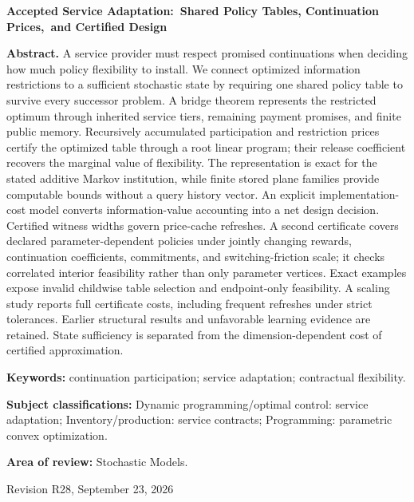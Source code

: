 \documentclass[11pt,letterpaper]{article}
\theoremstyle{definition}\newtheorem{assumption}[theorem]{Assumption}
\begin{document}
\begin{titlepage}\centering
{\Large\bfseries Accepted Service Adaptation:\ Shared Policy Tables, Continuation Prices,\ and Certified Design\par}
\vspace{.35in}{Anonymous manuscript for Operations Research\par}\vspace{.25in}
\begin{minipage}{\textwidth}
\textbf{Abstract.}
A service provider must respect promised continuations when deciding how much policy flexibility to install. We connect optimized information restrictions to a sufficient stochastic state by requiring one shared policy table to survive every successor problem. A bridge theorem represents the restricted optimum through inherited service tiers, remaining payment promises, and finite public memory. Recursively accumulated participation and restriction prices certify the optimized table through a root linear program; their release coefficient recovers the marginal value of flexibility. The representation is exact for the stated additive Markov institution, while finite stored plane families provide computable bounds without a query history vector. An explicit implementation-cost model converts information-value accounting into a net design decision. Certified witness widths govern price-cache refreshes. A second certificate covers declared parameter-dependent policies under jointly changing rewards, continuation coefficients, commitments, and switching-friction scale; it checks correlated interior feasibility rather than only parameter vertices. Exact examples expose invalid childwise table selection and endpoint-only feasibility. A scaling study reports full certificate costs, including frequent refreshes under strict tolerances. Earlier structural results and unfavorable learning evidence are retained. State sufficiency is separated from the dimension-dependent cost of certified approximation.
\par\vspace{.15in}\textbf{Keywords:} continuation participation; service adaptation; contractual flexibility.
\par\vspace{.1in}\textbf{Subject classifications:} Dynamic programming/optimal control: service adaptation; Inventory/production: service contracts; Programming: parametric convex optimization.
\par\vspace{.1in}\textbf{Area of review:} Stochastic Models.
\end{minipage}\vfill{Revision R28, September 23, 2026\par}
\end{titlepage}
\end{document}
